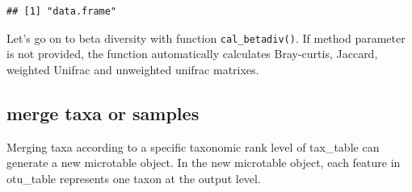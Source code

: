 \documentclass[
]{book}
\newenvironment{Shaded}{\begin{snugshade}}{\end{snugshade}}
\newcommand{\AttributeTok}[1]{\textcolor[rgb]{0.77,0.63,0.00}{#1}}
\newcommand{\CommentTok}[1]{\textcolor[rgb]{0.56,0.35,0.01}{\textit{#1}}}
\newcommand{\ConstantTok}[1]{\textcolor[rgb]{0.00,0.00,0.00}{#1}}
\newcommand{\FunctionTok}[1]{\textcolor[rgb]{0.00,0.00,0.00}{#1}}
\newcommand{\NormalTok}[1]{#1}
\newcommand{\SpecialCharTok}[1]{\textcolor[rgb]{0.00,0.00,0.00}{#1}}
\newcommand{\StringTok}[1]{\textcolor[rgb]{0.31,0.60,0.02}{#1}}
\begin{document}
\begin{Shaded}
\end{Shaded}

\begin{verbatim}
## [1] "data.frame"
\end{verbatim}

\begin{Shaded}
\end{Shaded}

Let's go on to beta diversity with function \texttt{cal\_betadiv()}.
If method parameter is not provided, the function automatically calculates Bray-curtis, Jaccard, weighted Unifrac and unweighted unifrac matrixes.

\begin{Shaded}
\end{Shaded}

\hypertarget{merge-taxa-or-samples}{%
\subsection{merge taxa or samples}\label{merge-taxa-or-samples}}

Merging taxa according to a specific taxonomic rank level of tax\_table can generate a new microtable object.
In the new microtable object, each feature in otu\_table represents one taxon at the output level.
\end{document}
